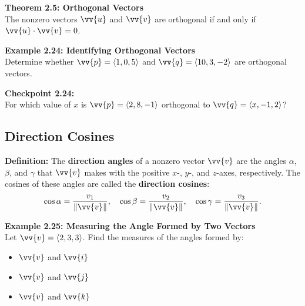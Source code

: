 \documentclass{article}
\begin{document}
\begin{theorembox}
    \textbf{Theorem 2.5: Orthogonal Vectors} \\
    The nonzero vectors \(\vv{u}\) and \(\vv{v}\) are orthogonal if and only if \(\vv{u} \cdot \vv{v} = 0\).
\end{theorembox}

\begin{examplebox}
    \textbf{Example 2.24: Identifying Orthogonal Vectors} \\
    Determine whether \(\vv{p} = \langle 1, 0, 5 \rangle\) and \(\vv{q} = \langle 10, 3, -2 \rangle\) are orthogonal vectors.
\end{examplebox}

\begin{exercisebox}
    \textbf{Checkpoint 2.24:} \\
    For which value of \(x\) is \(\vv{p} = \langle 2, 8, -1 \rangle\) orthogonal to \(\vv{q} = \langle x, -1, 2 \rangle\)?
\end{exercisebox}

\subsection*{Direction Cosines}

\begin{definitionbox}
    \textbf{Definition:} The \textbf{direction angles} of a nonzero vector \(\vv{v}\) are the angles \(\alpha\), \(\beta\), and \(\gamma\) that \(\vv{v}\) makes with the positive \(x\)-, \(y\)-, and \(z\)-axes, respectively. The cosines of these angles are called the \textbf{direction cosines}:
    \[
    \cos \alpha = \frac{v_1}{\|\vv{v}\|}, \quad \cos \beta = \frac{v_2}{\|\vv{v}\|}, \quad \cos \gamma = \frac{v_3}{\|\vv{v}\|}.
    \]
\end{definitionbox}

\begin{examplebox}
    \textbf{Example 2.25: Measuring the Angle Formed by Two Vectors} \\
    Let \(\vv{v} = \langle 2, 3, 3 \rangle\). Find the measures of the angles formed by:
    \begin{itemize}
        \item \(\vv{v}\) and \(\vv{i}\)
        \item \(\vv{v}\) and \(\vv{j}\)
        \item \(\vv{v}\) and \(\vv{k}\)
    \end{itemize}
\end{examplebox}
\end{document}
